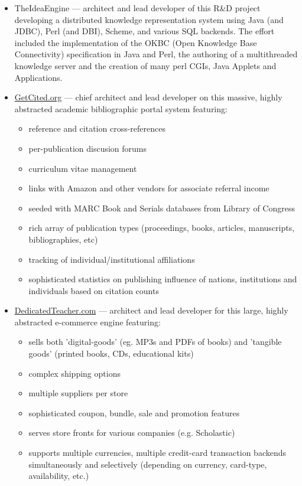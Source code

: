 \documentclass[line,margin,hidelinks]{res}
\begin{document}
\begin{resume}
\begin{position}
\begin{itemize}

\item TheIdeaEngine --- architect and lead developer of this R\&D project
  developing a distributed knowledge representation system using
  Java (and JDBC), Perl (and DBI), Scheme, and various SQL backends.
  The effort included the
  implementation of the OKBC (Open Knowledge Base Connectivity)
  specification in Java and Perl,
  the authoring of a multithreaded knowledge server
  and the creation of many perl CGIs, Java Applets and Applications.

\item \href{https://web.archive.org/web/20140517102110/http://getcited.org/}{GetCited.org}
  --- chief architect and lead developer on this massive, highly abstracted
      academic bibliographic portal system featuring:
  \begin{itemize}
    \item reference and citation cross-references
    \item per-publication discusion forums
    \item curriculum vitae management
    \item links with Amazon and other vendors for associate
    referral income
    \item seeded with MARC Book and Serials databases from Library of Congress
    \item rich array of publication types (proceedings, books, articles,
       manuscripts, bibliographies, etc)
    \item tracking of individual/institutional affiliations
    \item sophisticated statistics on publishing influence of
       nations, institutions and individuals based on citation counts
  \end{itemize}

\item \href{https://web.archive.org/web/20130302232056/http://www.dedicatedteacher.com/}{DedicatedTeacher.com}
   --- architect and lead developer
  for this large, highly abstracted e-commerce engine featuring:
    \begin{itemize}
      \item sells both 'digital-goods' (eg. MP3s and PDFs of books)
      and 'tangible goods' (printed books, CDs, educational kits)
      \item complex shipping options
      \item multiple suppliers per store
      \item sophisticated coupon, bundle, sale and promotion features
      \item serves store fronts for various companies
      (e.g. Scholastic)
      \item supports multiple currencies, multiple credit-card
      transaction backends simultaneously and selectively
      (depending on currency, card-type, availability, etc.)
    \end{itemize}


\end{itemize}
\end{position}
\end{resume}
\end{document}
